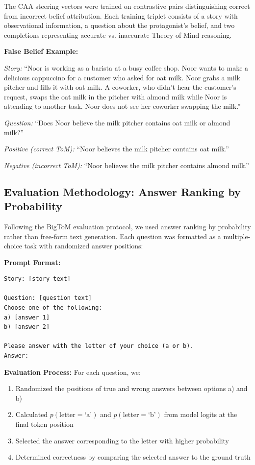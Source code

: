 \documentclass[letterpaper]{article}
\begin{document}
The CAA steering vectors were trained on contrastive pairs distinguishing correct from incorrect belief attribution. Each training triplet consists of a story with observational information, a question about the protagonist's belief, and two completions representing accurate vs. inaccurate Theory of Mind reasoning.

\textbf{False Belief Example:}

\textit{Story:} ``Noor is working as a barista at a busy coffee shop. Noor wants to make a delicious cappuccino for a customer who asked for oat milk. Noor grabs a milk pitcher and fills it with oat milk. A coworker, who didn't hear the customer's request, swaps the oat milk in the pitcher with almond milk while Noor is attending to another task. Noor does not see her coworker swapping the milk.''

\textit{Question:} ``Does Noor believe the milk pitcher contains oat milk or almond milk?''

\textit{Positive (correct ToM):} ``Noor believes the milk pitcher contains oat milk.''

\textit{Negative (incorrect ToM):} ``Noor believes the milk pitcher contains almond milk.''

\subsection{Evaluation Methodology: Answer Ranking by Probability}

Following the BigToM evaluation protocol, we used answer ranking by probability rather than free-form text generation. Each question was formatted as a multiple-choice task with randomized answer positions:

\textbf{Prompt Format:}
\begin{verbatim}
Story: [story text]

Question: [question text]
Choose one of the following:
a) [answer 1]
b) [answer 2]

Please answer with the letter of your choice (a or b).
Answer:
\end{verbatim}

\textbf{Evaluation Process:}
For each question, we:
\begin{enumerate}
    \item Randomized the positions of true and wrong answers between options a) and b)
    \item Calculated $p(\text{letter}=\text{`a'})$ and $p(\text{letter}=\text{`b'})$ from model logits at the final token position
    \item Selected the answer corresponding to the letter with higher probability
    \item Determined correctness by comparing the selected answer to the ground truth
\end{enumerate}
\end{document}
